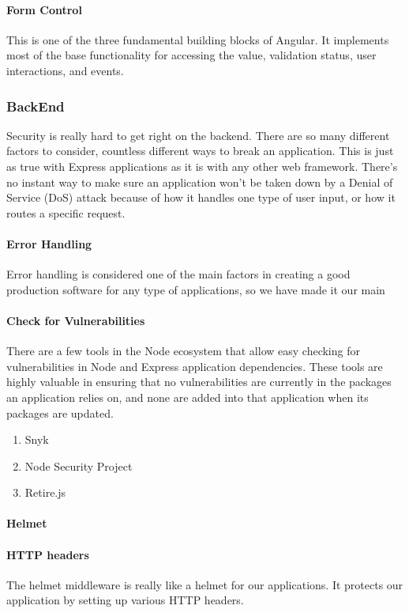\paragraph*{Form Control}
This is one of the three fundamental building blocks of Angular. It implements most of the base functionality for accessing the value, validation status, user interactions, and events.
\subsubsection{BackEnd}
Security is really hard to get right on the backend. There are so many different factors to consider, countless different ways to break an application. 
This is just as true with Express applications as it is with any other web framework. There's no instant way to make sure an application won't be taken down by a Denial of Service (DoS) attack because of how it handles one type of user input, or how it routes a specific request.
\paragraph*{Error Handling}
Error handling is considered one of the main factors in creating a good production software for any type of applications, so we have made it our main 
\paragraph*{Check for Vulnerabilities}
There are a few tools in the Node ecosystem that allow easy checking for vulnerabilities in Node and Express application dependencies. These tools are highly valuable in ensuring that no vulnerabilities are currently in the packages an application relies on, and none are added into that application when its packages are updated.
\begin{enumerate}
      \item Snyk
      \item Node Security Project
      \item Retire.js
\end{enumerate}

\paragraph*{Helmet}
\paragraph*{HTTP headers}
The helmet middleware is really like a helmet for our applications. It protects our application by setting up various HTTP headers.
